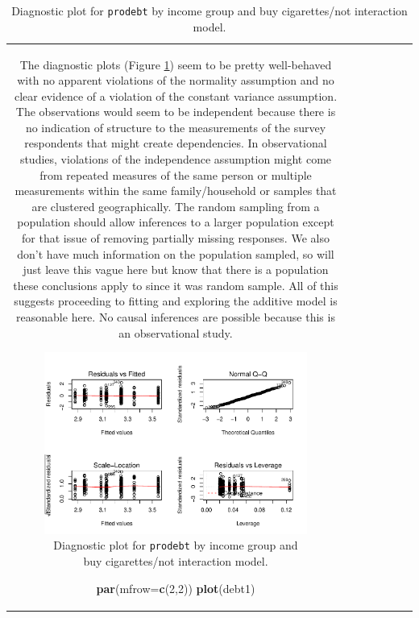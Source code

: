 \documentclass[]{book}
\newenvironment{Shaded}{\begin{snugshade}}{\end{snugshade}}
\newcommand{\KeywordTok}[1]{\textcolor[rgb]{0.13,0.29,0.53}{\textbf{#1}}}
\newcommand{\DataTypeTok}[1]{\textcolor[rgb]{0.13,0.29,0.53}{#1}}
\newcommand{\DecValTok}[1]{\textcolor[rgb]{0.00,0.00,0.81}{#1}}
\newcommand{\NormalTok}[1]{#1}
\theoremstyle{definition}
\theoremstyle{definition}
\theoremstyle{remark}
\begin{document}
\begin{longtable}[]{@{}ccccccc@{}}
\begin{minipage}[b]{0.10\columnwidth}
\begin{Shaded}
\begin{Highlighting}[]
\begin{Shaded}
\begin{Highlighting}[]
\begin{Shaded}
\begin{Highlighting}[]
\begin{Shaded}
\begin{Highlighting}[]
\begin{Shaded}
\begin{Highlighting}[]
The diagnostic plots (Figure \ref{fig:Figure4-13}) seem to be pretty
well-behaved with no apparent violations of the normality assumption and
no clear evidence of a violation of the constant variance assumption.
The observations would seem to be independent because there is no
indication of structure to the measurements of the survey respondents
that might create dependencies. In observational studies, violations of
the independence assumption might come from repeated measures of the
same person or multiple measurements within the same family/household or
samples that are clustered geographically. The random sampling from a
population should allow inferences to a larger population except for
that issue of removing partially missing responses. We also don't have
much information on the population sampled, so will just leave this
vague here but know that there is a population these conclusions apply
to since it was random sample. All of this suggests proceeding to
fitting and exploring the additive model is reasonable here. No causal
inferences are possible because this is an observational study.




\begin{figure}
\centering
\includegraphics{04-twoWayAnova_files/figure-latex/Figure4-13-1.pdf}
\caption{\label{fig:Figure4-13}Diagnostic plot for \texttt{prodebt} by income group and
buy cigarettes/not interaction model.}
\end{figure}

\begin{Shaded}
\begin{Highlighting}[]
\KeywordTok{par}\NormalTok{(}\DataTypeTok{mfrow=}\KeywordTok{c}\NormalTok{(}\DecValTok{2}\NormalTok{,}\DecValTok{2}\NormalTok{))}
\KeywordTok{plot}\NormalTok{(debt1)}
\end{Highlighting}
\end{Shaded}


\end{Highlighting}
\end{Shaded}
\end{Highlighting}
\end{Shaded}
\end{Highlighting}
\end{Shaded}
\end{Highlighting}
\end{Shaded}
\end{Highlighting}
\end{Shaded}
\end{minipage}
\end{longtable}
\end{document}
